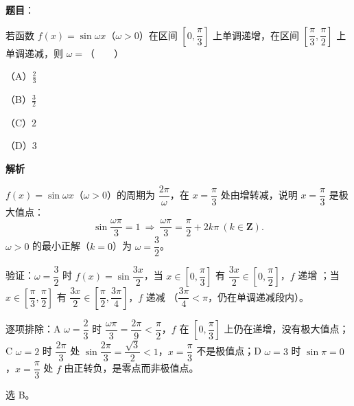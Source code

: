 \begin{answer}

\textbf{题目}：

若函数 $f(x)=\sin\omega x$（$\omega>0$）在区间 $\left[0,\dfrac{\pi}{3}\right]$ 上单调递增，在区间 $\left[\dfrac{\pi}{3},\dfrac{\pi}{2}\right]$ 上单调递减，则 $\omega=$\mbox{（　　）}

（A）$\frac23$

（B）$\frac32$

（C）$2$

（D）$3$

\textbf{解析}

$f(x)=\sin\omega x$（$\omega>0$）的周期为 $\dfrac{2\pi}{\omega}$，在 $x=\dfrac{\pi}{3}$ 处由增转减，说明 $x=\dfrac{\pi}{3}$ 是极大值点：
\nopagebreak[4]
\[
\sin\frac{\omega\pi}{3}=1\ \Longrightarrow\ \frac{\omega\pi}{3}=\frac{\pi}{2}+2k\pi\ (k\in\mathbf Z).
\]
$\omega>0$ 的最小正解（$k=0$）为 $\omega=\dfrac32$。

验证：$\omega=\dfrac32$ 时 $f(x)=\sin\dfrac{3x}{2}$，当 $x\in\left[0,\dfrac{\pi}{3}\right]$ 有 $\dfrac{3x}{2}\in\left[0,\dfrac{\pi}{2}\right]$，$f$ 递增 ；当 $x\in\left[\dfrac{\pi}{3},\dfrac{\pi}{2}\right]$ 有 $\dfrac{3x}{2}\in\left[\dfrac{\pi}{2},\dfrac{3\pi}{4}\right]$，$f$ 递减 （$\dfrac{3\pi}{4}<\pi$，仍在单调递减段内）。

逐项排除：A $\omega=\dfrac23$ 时 $\dfrac{\omega\pi}{3}=\dfrac{2\pi}{9}<\dfrac{\pi}{2}$，$f$ 在 $\left[0,\dfrac{\pi}{3}\right]$ 上仍在递增，没有极大值点；C $\omega=2$ 时 $\dfrac{2\pi}{3}$ 处 $\sin\dfrac{2\pi}{3}=\dfrac{\sqrt3}{2}<1$，$x=\dfrac{\pi}{3}$ 不是极值点；D $\omega=3$ 时 $\sin\pi=0$，$x=\dfrac{\pi}{3}$ 处 $f$ 由正转负，是零点而非极值点。

选 B。


\end{answer}
